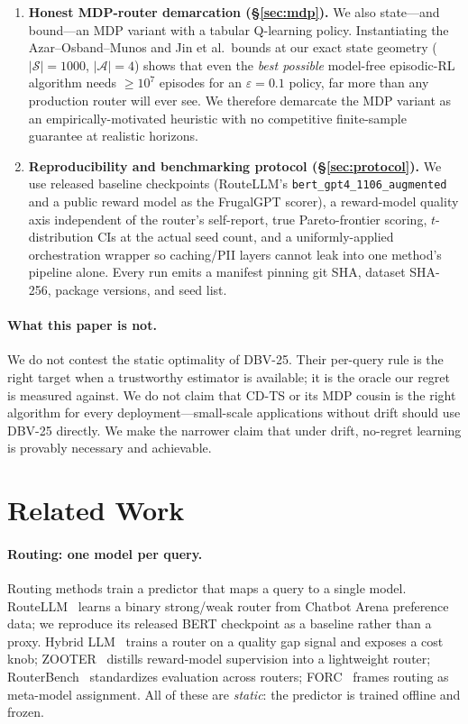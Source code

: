 \documentclass[11pt]{article}
\theoremstyle{definition}
\begin{document}
\begin{enumerate}[leftmargin=*, itemsep=2pt, topsep=2pt]
\item \textbf{Honest MDP-router demarcation (\S\ref{sec:mdp}).} We also
state---and bound---an MDP variant with a tabular Q-learning policy.
Instantiating the Azar--Osband--Munos and Jin et al.\ bounds at our exact
state geometry ($|\mathcal{S}|=1000$, $|\mathcal{A}|=4$) shows that even
the \emph{best possible} model-free episodic-RL algorithm needs
${\geq}10^7$ episodes for an $\varepsilon{=}0.1$ policy, far more than any
production router will ever see. We therefore demarcate the MDP variant as
an empirically-motivated heuristic with no competitive finite-sample
guarantee at realistic horizons.

\item \textbf{Reproducibility and benchmarking protocol
(\S\ref{sec:protocol}).} We use released baseline checkpoints
(RouteLLM's \texttt{bert\_gpt4\_1106\_augmented} and a public reward model
as the FrugalGPT scorer), a reward-model quality axis independent of the
router's self-report, true Pareto-frontier scoring, $t$-distribution CIs
at the actual seed count, and a uniformly-applied orchestration wrapper
so caching/PII layers cannot leak into one method's pipeline alone. Every
run emits a manifest pinning git SHA, dataset SHA-256, package versions,
and seed list.
\end{enumerate}

\paragraph{What this paper is not.}
We do not contest the static optimality of DBV-25. Their per-query rule is
the right target when a trustworthy estimator is available; it is the
oracle our regret is measured against. We do not claim that CD-TS or its
MDP cousin is the right algorithm for every deployment---small-scale
applications without drift should use DBV-25 directly. We make the narrower
claim that under drift, no-regret learning is provably necessary and
achievable.

\section{Related Work}
\label{sec:related}

\paragraph{Routing: one model per query.}
Routing methods train a predictor that maps a query to a single model.
RouteLLM~\cite{ong2024routellm} learns a binary strong/weak router from
Chatbot Arena preference data; we reproduce its released BERT checkpoint as
a baseline rather than a proxy. Hybrid LLM~\cite{ding2024hybrid} trains a
router on a quality gap signal and exposes a cost knob; ZOOTER~\cite{lu2023zooter}
distills reward-model supervision into a lightweight router;
RouterBench~\cite{hu2024routerbench} standardizes evaluation across
routers; FORC~\cite{sakota2024forc} frames routing as meta-model
assignment. All of these are \emph{static}: the predictor is trained
offline and frozen.
\end{document}
